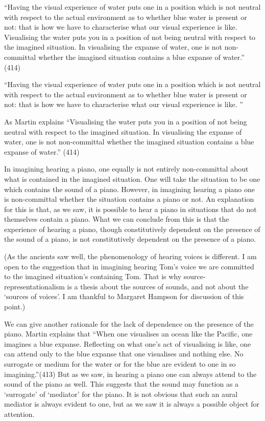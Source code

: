\documentclass[sloppy, journal, git, bytitle, dodraft]{humapap}
\begin{document}
``Having the visual experience of water puts one in a position which is not neutral with respect to the actual environment as to whether blue water is present or not: that is how we have to characterise what our visual experience is like. Visualising the water puts you in a position of not being neutral with respect to the imagined situation. In visualising the expanse of water, one is not non-committal whether the imagined situation contains a blue expanse of water.'' (414)

``Having the visual experience of water puts one in a position which is not neutral with respect to the actual environment as to whether blue water is present or not: that is how we have to characterise what our visual experience is like. ''

As Martin explains ``Visualising the water puts you in a position of not being neutral with respect to the imagined situation. In visualising the expanse of water, one is not non-committal whether the imagined situation contains a blue expanse of water.'' (414)

In imagining hearing a piano, one equally is not entirely non-committal about what is contained in the imagined situation. One will take the situation to be one which contains the sound of a piano. However, in imagining hearing a piano one is non-committal whether the situation contains a piano or not. An explanation for this is that, as we saw, it is possible to hear a piano in situations that do not themselves contain a piano. What we can conclude from this is that the experience of hearing a piano, though constitutively dependent on the presence of the sound of a piano, is not constitutively dependent on the presence of a piano. 

(As the ancients saw well, the phenomenology of hearing voices is different. I am open to the suggestion that in imagining hearing Tom's voice we are committed to the imagined situation's containing Tom. That is why source-representationalism is a thesis about the sources of sounds, and not about the `sources of voices'. I am thankful to Margaret Hampson for discussion of this point.)

We can give another rationale for the lack of dependence on the presence of the piano. Martin explains that ``When one visualises an ocean like the Pacific, one imagines a blue expanse. Reflecting on what one’s act of visualising is like, one can attend only to the blue expanse that one visualises and nothing else. No surrogate or medium for the water or for the blue are evident to one in so imagining.''(413) But as we saw, in hearing a piano one can always attend to the sound of the piano as well. This suggests that the sound may function as a `surrogate' of `mediator' for the piano. It is not obvious that such an aural mediator is always evident to one, but as we saw it is always a possible object for attention. 
\end{document}
